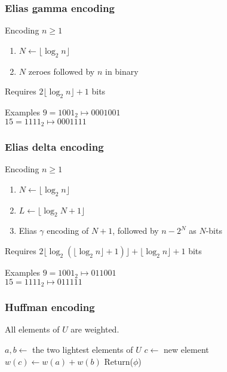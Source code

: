 \documentclass[12pt,aspectratio=169]{beamer}
\begin{document}
\begin{frame}\frametitle{Elias gamma encoding}
\begin{block}{Encoding $n\ge 1$}
\begin{enumerate} 
\item
$N\gets \lfloor \log_{2} n \rfloor$
\item
$N$ zeroes followed by $n$ in binary
\end{enumerate}
Requires $2\lfloor \log_{2} n \rfloor +1$ bits
\end{block}

\begin{block}{Examples}
$9 = 1001_{2} \mapsto 000 1001$\\
$15 = 1111_{2} \mapsto 000 1111$\\
\end{block}
\end{frame}

\begin{frame}\frametitle{Elias delta encoding}
\begin{block}{Encoding $n\ge 1$}
\begin{enumerate} 
\item
$N\gets \lfloor \log_{2} n \rfloor$
\item
$L\gets \lfloor \log_{2} N+1 \rfloor$
\item
Elias $\gamma$ encoding of $N+1$, followed by $n-2^{N}$ as $N$-bits
\end{enumerate}
Requires $2\lfloor \log_{2} \left( \lfloor \log_{2} n \rfloor + 1 \right)\rfloor
 +\lfloor \log_{2} n \rfloor + 1$ bits
\end{block}

\begin{block}{Examples}
$9 = 1001_{2} \mapsto 01 1 001$\\
$15 = 1111_{2} \mapsto 01 1 111$\\
\end{block}
\end{frame}

\begin{frame}\frametitle{Huffman encoding}
All elements of $U$ are weighted.    
\begin{algorithm}[H]
$a,b\gets$ the two lightest elements of $U$\;
$c\gets$ new element
$w(c) \gets w(a) + w(b)$\;
Return($\phi$)\;
\caption{Huffman encoding}
\end{algorithm}

\end{frame}
\end{document}
